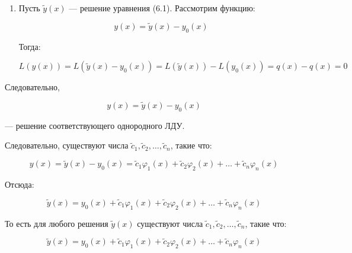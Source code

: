 {\begin{enumerate}
		\[
		  L(y(x)) = L(y_0(x)) + L(c_1\varphi_1(x) + c_2\varphi_2(x) + \ldots + c_n \varphi_n(x)) = q(x) + 0 = q(x)
		\]

		\item Пусть \( \tilde{y}(x) \) — решение уравнения (6.1). Рассмотрим функцию:
  

		\[
		  y(x) = \tilde{y}(x) - y_0(x)
		  \]
		
		
		  Тогда:
		  
		
		\[
		  L(y(x)) = L(\tilde{y}(x) - y_0(x)) = L(\tilde{y}(x)) - L(y_0(x)) = q(x) - q(x) = 0
		  \]
		


	\end{enumerate}

	Следовательно,


\[
y(x) = \tilde{y}(x) - y_0(x)
\]


— решение соответствующего однородного ЛДУ.

Следовательно, существуют числа \( \tilde{c}_1, \tilde{c}_2, \ldots, \tilde{c}_n \), такие что:


\[
y(x) = \tilde{y}(x) - y_0(x) = \tilde{c}_1 \varphi_1(x) + \tilde{c}_2 \varphi_2(x) + \ldots + \tilde{c}_n \varphi_n(x)
\]



Отсюда:


\[
\tilde{y}(x) = y_0(x) + \tilde{c}_1 \varphi_1(x) + \tilde{c}_2 \varphi_2(x) + \ldots + \tilde{c}_n \varphi_n(x)
\]



То есть для любого решения \( \tilde{y}(x) \) существуют числа \( \tilde{c}_1, \tilde{c}_2, \ldots, \tilde{c}_n \), такие что:


\[
\tilde{y}(x) = y_0(x) + \tilde{c}_1 \varphi_1(x) + \tilde{c}_2 \varphi_2(x) + \ldots + \tilde{c}_n \varphi_n(x)
\]

	\newpage
}